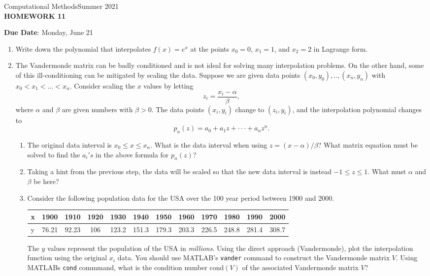 \documentclass[12pt]{article}
\begin{document}
\begin{center}
Computational Methods\qquad Summer 2021
\\

\textbf{\large HOMEWORK 11}\\
\end{center}
\noindent \textbf{Due Date}: Monday, June 21\\

\begin{enumerate}
\item Write down the polynomial that interpolates $f(x)=e^x$ at the points $x_0=0$, $x_1 = 1$, and $x_2=2$ in Lagrange form.
\item The Vandermonde matrix can be badly conditioned and is not ideal for solving many interpolation problems. On the other hand, some of this ill-conditioning can be mitigated by scaling the data. Suppose we are given data points $(x_0,y_0),..,(x_n,y_n)$ with $x_0<x_1<...<x_n$. Consider scaling the $x$ values by letting 
	\[z_i = \frac{x_i-\alpha}{\beta},\]
where $\alpha$ and $\beta$ are given numbers with $\beta>0$. The data points $(x_i,y_i)$ change to $(z_i,y_i)$, and the interpolation polynomial changes to 
	\[p_n(z) = a_0+a_1 z+\cdot\cdot\cdot+a_n z^n.\]
	\begin{enumerate}
	\item The original data interval is $x_0\le x\le x_n$. What is the data interval when using $z=(x-\alpha)/\beta$? What matrix equation must be solved to find the $a_i's$ in the above formula for $p_n(z)$?
	\item Taking a hint from the previous step, the data will be scaled so that the new data interval is instead $-1\le z\le 1$. What must $\alpha$ and $\beta$ be here?
	\item Consider the following population data for the USA over the 100 year period between 1900 and 2000.
	\begin{center}
  \begin{tabular}{ l | c | c | c | c | c | c | c | c | c | c | c }
    x & 1900 & 1910 & 1920 & 1930 & 1940 & 1950 & 1960 & 1970 & 1980 & 1990 & 2000\\ \hline
    y & 76.21 & 92.23 & 106 & 123.2 & 151.3 & 179.3 & 203.3 & 226.5 & 248.8 & 281.4 & 308.7
  \end{tabular}
\end{center}
	The $y$ values represent the population of the USA in \emph{millions}. Using the direct approach (Vandermonde), plot the interpolation function using the original $x_i$ data. You should use MATLAB's \texttt{vander} command to construct the Vandermonde matrix $V$. Using MATLABs \texttt{cond} commmand, what is the condition number $\mathrm{cond}(V)$ of the associated Vandermonde matrix $V$?

\end{enumerate}
\end{enumerate}
\end{document}
